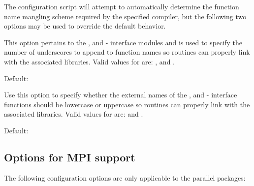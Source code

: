 \noindent The configuration script will attempt to automatically determine the
function name mangling scheme required by the specified {\F} compiler, but the
following two options may be used to override the default behavior.

\begin{config}

\item {}

  This option pertains to the {\fkinsol}, {\fcvode} and {\fnvector} {\F}-{\C}
  interface modules and is used to specify the number of underscores to append
  to function names so {\F} routines can properly link with the associated
  {\sundials} libraries. Valid values for  are: , 
  and .

  Default: 

\item {}

  Use this option to specify whether the external names of the {\fkinsol},
  {\fcvode} and {\fnvector} {\F}-{\C} interface functions should be lowercase
  or uppercase so {\F} routines can properly link with the associated {\sundials}
  libraries. Valid values for  are:  and .

  Default: 

\end{config}



\subsection*{Options for MPI support}

\noindent The following configuration options are only applicable to the parallel {\sundials} packages:

